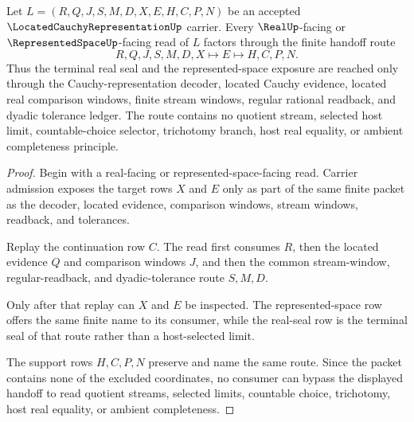 \begin{theorem}
\label{thm:located-cauchy-representation-real-seal-handoff}
Let $L=(R,Q,J,S,M,D,X,E,H,C,P,N)$ be an accepted $\LocatedCauchyRepresentationUp$ carrier. Every $\RealUp$-facing or $\RepresentedSpaceUp$-facing read of $L$ factors through the finite handoff route
$$
R,Q,J,S,M,D,X \longmapsto E \longmapsto H,C,P,N .
$$
Thus the terminal real seal and the represented-space exposure are reached only through the Cauchy-representation decoder, located Cauchy evidence, located real comparison windows, finite stream windows, regular rational readback, and dyadic tolerance ledger. The route contains no quotient stream, selected host limit, countable-choice selector, trichotomy branch, host real equality, or ambient completeness principle.
\end{theorem}
\begin{proof}
Begin with a real-facing or represented-space-facing read. Carrier admission exposes the target rows $X$ and $E$ only as part of the same finite packet as the decoder, located evidence, comparison windows, stream windows, readback, and tolerances.

Replay the continuation row $C$. The read first consumes $R$, then the located evidence $Q$ and comparison windows $J$, and then the common stream-window, regular-readback, and dyadic-tolerance route $S,M,D$.

Only after that replay can $X$ and $E$ be inspected. The represented-space row offers the same finite name to its consumer, while the real-seal row is the terminal seal of that route rather than a host-selected limit.

The support rows $H,C,P,N$ preserve and name the same route. Since the packet contains none of the excluded coordinates, no consumer can bypass the displayed handoff to read quotient streams, selected limits, countable choice, trichotomy, host real equality, or ambient completeness.
\end{proof}

